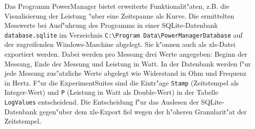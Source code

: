Das Programm PowerManager bietet erweiterte Funktionalit"aten, z.B. die Visualisierung der Leistung "uber eine Zeitspanne als Kurve. Die ermittelten Messwerte bei Ausf"uhrung des Programms in einer SQLite-Datenbank \texttt{database.sqlite} im Verzeichnis \texttt{C:\textbackslash Program Data\textbackslash PowerManagerDatabase} auf der zugreifenden Windows-Maschine abgelegt. Sie k"onnen auch als xls-Datei exportiert werden. Dabei werden pro Messung drei Werte angegeben: Beginn der Messung, Ende der Messung und Leistung in Watt. In der Datenbank werden f"ur jede Messung zus"atzliche Werte abgelegt wie Widerstand in Ohm und Frequenz in Hertz. F"ur die ExperimentSuites sind die Eintr"age \texttt{Stamp} (Zeitstempel als Integer-Wert) und \texttt{P} (Leistung in Watt als Double-Wert) in der Tabelle \texttt{LogValues} entscheidend. Die Entscheidung f"ur das Auslesen der SQLite-Datenbank gegen"uber dem xls-Export fiel wegen der h"oheren Granularit"at der Zeitstempel. 

